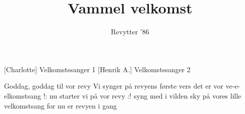 \documentclass[a4paper,11pt]{article}
\title{Vammel velkomst}
\author{Revytter '86}
\begin{document}
\maketitle

\begin{roles}
[Charlotte] Velkomstssanger 1
[Henrik A.] Velkomstssanger 2
\end{roles}




\begin{song}
Goddag, goddag
til vor revy
Vi synger på revyens første vers
det er vor ve-e-elkomstsang
!: nu starter vi på vor revy :!
syng med i vilden sky
på vores lille velkomstsang
for nu er revyen i gang
\end{song}
\end{document}
